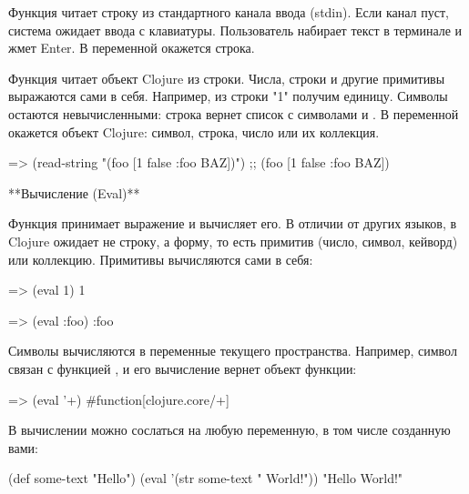 Функция  читает строку из стандартного канала ввода (stdin). Если канал пуст, система ожидает ввода с клавиатуры. Пользователь набирает текст в терминале и жмет Enter. В переменной  окажется строка.

Функция  читает объект Clojure из строки. Числа, строки и другие примитивы выражаются сами в себя. Например, из строки "1" получим единицу. Символы остаются невычисленными: строка  вернет список с символами  и . В переменной  окажется объект Clojure: символ, строка, число или их коллекция.

\begin{english}
  \begin{clojure}
=> (read-string "(foo [1 false {:foo BAZ}])")
;; (foo [1 false {:foo BAZ}])
  \end{clojure}
\end{english}

**Вычисление (Eval)**

Функция  принимает выражение и вычисляет его. В отличии от других языков, в Clojure  ожидает не строку, а форму, то есть примитив (число, символ, кейворд) или коллекцию. Примитивы вычисляются сами в себя:

\begin{english}
  \begin{clojure}
=> (eval 1)
1

=> (eval :foo)
:foo
  \end{clojure}
\end{english}
Символы вычисляются в переменные текущего пространства. Например, символ \code{+}
связан с функцией , и его вычисление вернет объект функции:

\begin{english}
  \begin{clojure}
=> (eval '+)
#function[clojure.core/+]
  \end{clojure}
\end{english}

В вычислении можно сослаться на любую переменную, в том числе созданную вами:

\begin{english}
  \begin{clojure}
(def some-text "Hello")
(eval '(str some-text " World!"))
"Hello World!"
  \end{clojure}
\end{english}

